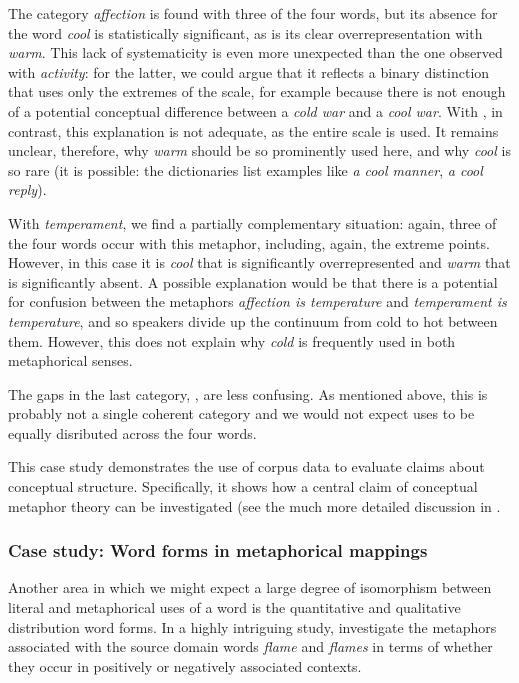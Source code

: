The category \textit{affection} is found with three of the four words, but its absence for the word \textit{cool} is statistically significant, as is its clear overrepresentation with \textit{warm}. This lack of systematicity is even more unexpected than the one observed with \textit{activity}: for the latter, we could argue that it reflects a binary distinction that uses only the extremes of the scale, for example because there is not enough of a potential conceptual difference between a \textit{cold war} and a \textit{cool war}. With , in contrast, this explanation is not adequate, as the entire scale is used. It remains unclear, therefore, why \textit{warm} should be so prominently used here, and why \textit{cool} is so rare (it is possible: the dictionaries list examples like \textit{a cool manner}, \textit{a cool reply}).

With \textit{temperament}, we find a partially complementary situation: again, three of the four words occur with this metaphor, including, again, the extreme points. However, in this case it is \textit{cool} that is significantly overrepresented and \textit{warm} that is significantly absent. A possible explanation would be that there is a potential for confusion between the metaphors \textit{affection is temperature} and \textit{temperament is temperature}, and so speakers divide up the continuum from cold to hot between them. However, this does not explain why \textit{cold} is frequently used in both metaphorical senses.

The gaps in the last category, , are less confusing. As mentioned above, this is probably not a single coherent category and we would not expect uses to be equally disributed across the four words.

This case study demonstrates the use of corpus data to evaluate claims about conceptual structure. Specifically, it shows how a central claim of conceptual metaphor theory can be investigated (see the much more detailed discussion in \citet{deignan_metaphorical_1999}.

\subsubsection{Case study: Word forms in metaphorical mappings}
\label{sec:flamevsflames}

Another area in which we might expect a large degree of isomorphism between literal and metaphorical uses of a word is the quantitative and qualitative distribution word forms. In a highly intriguing study, \citet{stefanowitsch_grammar_2006} investigate the metaphors associated with the source domain words \textit{flame} and \textit{flames} in terms of whether they occur in positively or negatively associated contexts.

